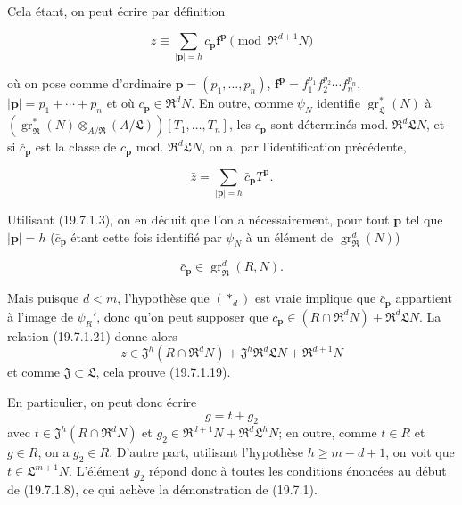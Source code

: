 Cela étant, on peut écrire par définition
\begin{env}[19.7.1.21]
\label{IV.19.7.1.21}
\[
  z\equiv\sum_{|\mathbf p|=h}c_{\mathbf p}\mathbf f^{\mathbf p}\pmod{\mathfrak R^{d+1}N}
\]
\end{env}
où on pose comme d'ordinaire $\mathbf p=(p_1,\ldots,p_n)$, $\mathbf f^{\mathbf p}=f_1^{p_1}f_2^{p_2}\cdots f_n^{p_n}$, $|\mathbf p|=p_1+\cdots+p_n$ et où $c_{\mathbf p}\in\mathfrak R^dN$. En outre, comme $\psi_N$ identifie $\operatorname{gr}_{\mathfrak L}^*(N)$ à $(\operatorname{gr}_{\mathfrak R}^*(N)\otimes_{A/\mathfrak R}(A/\mathfrak L))[T_1,\ldots,T_n]$, les $c_{\mathbf p}$ sont déterminés mod. $\mathfrak R^d\mathfrak LN$, et si $\bar c_{\mathbf p}$ est la classe de $c_{\mathbf p}$ mod. $\mathfrak R^d\mathfrak LN$, on a, par l'identification précédente,
\begin{env}[19.7.1.22]
\label{IV.19.7.1.22}
\[
  \bar z=\sum_{|\mathbf p|=h}\bar c_{\mathbf p}T^{\mathbf p}.
\]
\end{env}
Utilisant (19.7.1.3), on en déduit que l'on a nécessairement, pour tout $\mathbf p$ tel que $|\mathbf p|=h$ ($\bar c_{\mathbf p}$ étant cette fois identifié par $\psi_N$ à un élément de $\operatorname{gr}_{\mathfrak R}^d(N)$)
\begin{env}[19.7.1.23]
\label{IV.19.7.1.23}
\[
  \bar c_{\mathbf p}\in\operatorname{gr}_{\mathfrak R}^d(R,N).
\]
\end{env}
Mais puisque $d<m$, l'hypothèse que $(*_d)$ est vraie implique que $\bar c_{\mathbf p}$ appartient à l'image de $\psi_R'$, donc qu'on peut supposer que $c_{\mathbf p}\in(R\cap\mathfrak R^dN)+\mathfrak R^d\mathfrak LN$. La relation (19.7.1.21) donne alors
\[
  z\in\mathfrak J^h(R\cap\mathfrak R^dN)+\mathfrak J^h\mathfrak R^d\mathfrak LN+\mathfrak R^{d+1}N
\]
et comme $\mathfrak J\subset\mathfrak L$, cela prouve (19.7.1.19).


En particulier, on peut donc écrire
\[
  g=t+g_2
\]
avec $t\in\mathfrak J^h(R\cap\mathfrak R^dN)$ et $g_2\in\mathfrak R^{d+1}N+\mathfrak R^d\mathfrak L^hN$; en outre, comme $t\in R$ et $g\in R$, on a $g_2\in R$. D'autre part, utilisant l'hypothèse $h\geq m-d+1$, on voit que $t\in\mathfrak L^{m+1}N$. L'élément $g_2$ répond donc à toutes les conditions énoncées au début de (19.7.1.8), ce qui achève la démonstration de (19.7.1).

